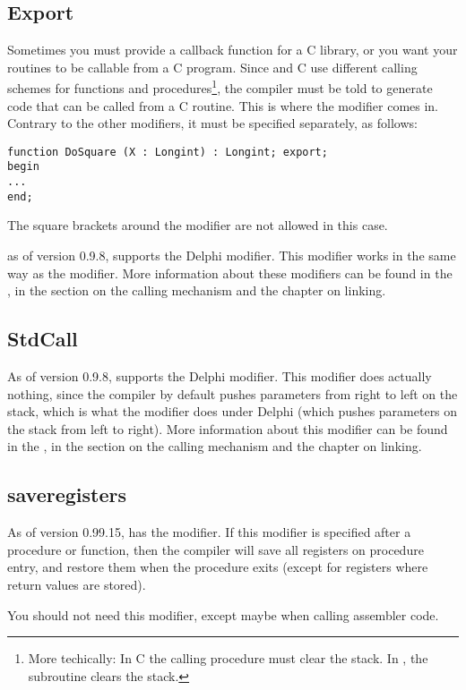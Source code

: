\documentclass{report}
\begin{document}
\subsection{Export}
Sometimes you must provide a callback function for a C library, or you want
your routines to be callable from a C program. Since \fpc and C use
different calling schemes for functions and procedures\footnote{More
techically: In C the calling procedure must clear the stack. In \fpc, the
subroutine clears the stack.}, the compiler must be told to generate code
that can be called from a C routine. This is where the  modifier
comes in. Contrary to the other modifiers, it must be specified separately,
as follows:
\begin{verbatim}
function DoSquare (X : Longint) : Longint; export;
begin
...
end;
\end{verbatim}
The square brackets around the modifier are not allowed in this case.
\begin{remark}
as of version 0.9.8, \fpc supports the Delphi  modifier.
This modifier works in the same way as the  modifier.
More information about these modifiers can be found in the \progref, in the
section on the calling mechanism and the chapter on linking.
\end{remark}

\subsection{StdCall}
As of version 0.9.8, \fpc supports the Delphi  modifier.
This modifier does actually nothing, since the \fpc compiler by default
pushes parameters from right to left on the stack, which is what the
modifier does under Delphi (which pushes parameters on the stack from left to
right).
More information about this modifier can be found in the \progref, in the
section on the calling mechanism and the chapter on linking.

\subsection{saveregisters}
As of version 0.99.15, \fpc has the  modifier. If this
modifier is specified after a procedure or function, then the \fpc compiler
will save all registers on procedure entry, and restore them when the
procedure exits (except for registers where return values are stored).

You should not need this modifier, except maybe when calling assembler code.
\end{document}
